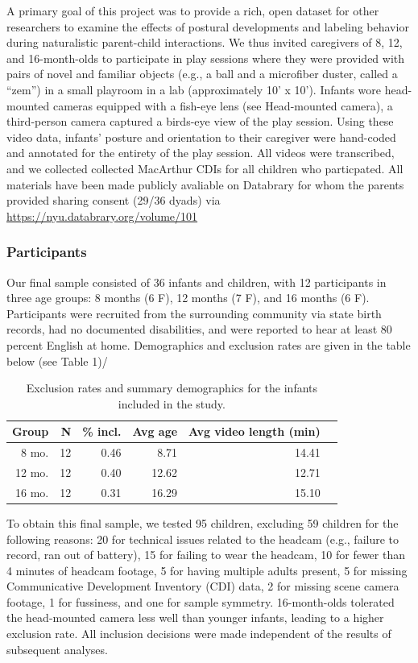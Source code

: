 \documentclass[english,man]{apa6}
\begin{document}
A primary goal of this project was to provide a rich, open dataset for
other researchers to examine the effects of postural developments and
labeling behavior during naturalistic parent-child interactions. We thus
invited caregivers of 8, 12, and 16-month-olds to participate in play
sessions where they were provided with pairs of novel and familiar
objects (e.g., a ball and a microfiber duster, called a \enquote{zem})
in a small playroom in a lab (approximately 10' x 10'). Infants wore
head-mounted cameras equipped with a fish-eye lens (see Head-mounted
camera), a third-person camera captured a birds-eye view of the play
session. Using these video data, infants' posture and orientation to
their caregiver were hand-coded and annotated for the entirety of the
play session. All videos were transcribed, and we collected collected
MacArthur CDIs for all children who particpated. All materials have been
made publicly avaliable on Databrary for whom the parents provided
sharing consent (29/36 dyads) via
\url{https://nyu.databrary.org/volume/101}

\subsubsection{Participants}\label{participants}

Our final sample consisted of 36 infants and children, with 12
participants in three age groups: 8 months (6 F), 12 months (7 F), and
16 months (6 F). Participants were recruited from the surrounding
community via state birth records, had no documented disabilities, and
were reported to hear at least 80 percent English at home. Demographics
and exclusion rates are given in the table below (see Table 1)/

\begin{table}[ht]
\centering
\begin{tabular}{rrrrrr}
\hline
Group & N & \% incl. & Avg age & Avg video length (min) \\
\hline
8 mo. &   12 & 0.46 & 8.71 & 14.41 \\
12 mo. &  12 & 0.40 & 12.62 & 12.71 \\
16 mo. &  12 & 0.31 & 16.29 & 15.10\\
\hline
\end{tabular}
\caption{Exclusion rates and summary demographics for the infants included in the study.} 
\end{table}

To obtain this final sample, we tested 95 children, excluding 59
children for the following reasons: 20 for technical issues related to
the headcam (e.g., failure to record, ran out of battery), 15 for
failing to wear the headcam, 10 for fewer than 4 minutes of headcam
footage, 5 for having multiple adults present, 5 for missing
Communicative Development Inventory (CDI) data, 2 for missing scene
camera footage, 1 for fussiness, and one for sample symmetry.
16-month-olds tolerated the head-mounted camera less well than younger
infants, leading to a higher exclusion rate. All inclusion decisions
were made independent of the results of subsequent analyses.
\end{document}
